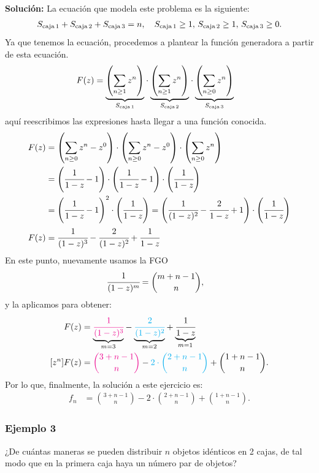 \textbf{Solución:} La ecuación que modela este problema es la siguiente:
\begin{align*}
S_{\rm caja\,1}+S_{\rm caja\,2}+S_{\rm caja\,3}=n,\quad S_{\rm caja\,1}\geq 1,\,S_{\rm caja\,2}\geq 1,\,S_{\rm caja\,3}\geq0.
\end{align*}
Ya que tenemos la ecuación, procedemos a plantear la función generadora a partir de esta ecuación.
\begin{align*}
F(z)&=\underset{S_{\rm caja\, 1}}{\underbrace{\left(\sum_{n\geq1}{z^n}\right)}}\cdot\underset{S_{\rm caja\,2}}{\underbrace{\left(\sum_{n\geq1}{z^n}\right)}}\cdot\underset{S_{\rm caja\,3}}{\underbrace{\left(\sum_{n\geq0}{z^n}\right)}}
\end{align*}
aquí reescribimos las expresiones hasta llegar a una función conocida.
\begin{align*}
F(z)&=\left(\sum_{n\geq 0}{z^n}-z^0\right)\cdot \left(\sum_{n\geq 0}{z^n}-z^0\right)\cdot\left(\sum_{n\geq0}z^n\right)\\
&=\left(\cfrac{1}{1-z}-1\right)\cdot\left(\cfrac{1}{1-z}-1\right)\cdot\left(\cfrac{1}{1-z}\right)\\
&=\left(\cfrac{1}{1-z}-1\right)^2\cdot\left(\cfrac{1}{1-z}\right)=\left(\cfrac{1}{(1-z)^2}-\cfrac{2}{1-z}+1\right)\cdot\left(\cfrac{1}{1-z}\right)\\
F(z)&=\cfrac{1}{(1-z)^3}-\cfrac{2}{(1-z)^2}+\cfrac{1}{1-z}
\end{align*}
En este punto, nuevamente usamos la FGO
\begin{align*}
[z^n]\cfrac{1}{(1-z)^m}&=\binom{m+n-1}{n},
\end{align*}
y la aplicamos para obtener:
\begin{align*}
F(z)&=\underset{m=3}{\underbrace{{\color{magenta}\cfrac{1}{(1-z)^3}}}}-\underset{m=2}{\underbrace{{\color{cyan}\cfrac{2}{(1-z)^2}}}}+\underset{m=1}{\underbrace{\cfrac{1}{1-z}}}\\
[z^n]F(z)&={\color{magenta}\binom{3+n-1}{n}}-{\color{cyan}2\cdot\binom{2+n-1}{n}}+\binom{1+n-1}{n}.
\end{align*}
Por lo que, finalmente, la solución a este ejercicio es:
\begin{align*}
f_n&=\binom{3+n-1}{n}-2\cdot\binom{2+n-1}{n}+\binom{1+n-1}{n}.
\end{align*}
\subsubsection*{Ejemplo 3}
¿De cuántas maneras se pueden distribuir $n$ objetos idénticos en 2 cajas, de tal modo que en la primera caja haya un número par de objetos?

